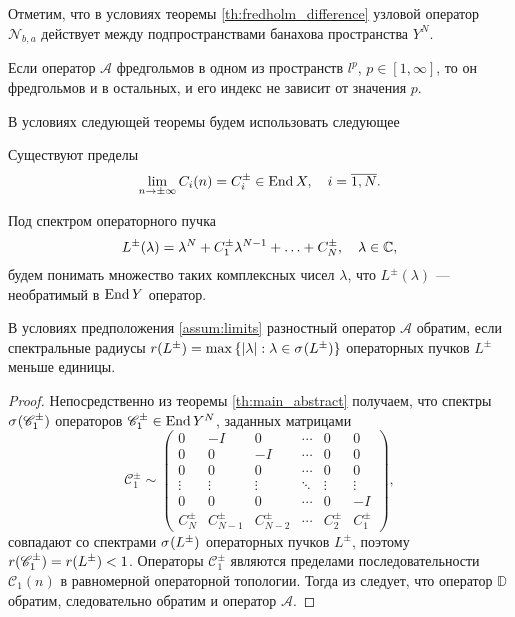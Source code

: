 Отметим, что в условиях теоремы \ref{th:fredholm_difference} узловой оператор $\mathcal N_{b, a}$ действует между подпространствами банахова пространства $Y^N$.

\begin{corollary}
    Если оператор $\mathcal A$ фредгольмов в одном из пространств $l^p$, $p \in [1, \infty]$, то он фредгольмов и в остальных, и его индекс не зависит от значения $p$.
\end{corollary}

В условиях следующей теоремы будем использовать следующее
\begin{assumption}\label{assum:limits}
    Существуют пределы
    \[ \lim_{n\to\pm\infty} C_i(n) = C_i^\pm \in \operatorname{End} X, \quad i = \overline{1,N}. \]
\end{assumption}

Под спектром операторного пучка
\[L^\pm(\lambda) = \lambda^N + C_1^\pm \lambda^{N-1} + \dotsc + C_N^\pm, \quad \lambda \in \mathbb{C}, \]
будем понимать множество таких комплексных чисел $\lambda$, что $L^\pm(\lambda)$ --- необратимый в $\operatorname{End} Y$ оператор.

\begin{theorem}
    В условиях предположения \ref{assum:limits} разностный оператор $\mathcal A$ обратим, если спектральные радиусы $r(L^\pm) = \max\menge{\absv{\lambda} : \lambda \in \spectrum{L^\pm}}$ операторных пучков $L^\pm$ меньше единицы.
\end{theorem}

\begin{proof}
    Непосредственно из теоремы \ref{th:main_abstract} получаем, что спектры $\spectrum{\mathcal C_1^\pm}$ операторов $\mathcal C_1^\pm \in \operatorname{End} Y^N$, заданных матрицами
    \[\mathcal C_1^\pm \sim \begin{pmatrix}
    0 & -I & 0  & \cdots & 0 & 0 \\
    0 & 0  & -I & \cdots & 0 & 0 \\
    0 & 0  & 0 & \cdots & 0 & 0 \\
    \vdots & \vdots & \vdots & \ddots & \vdots & \vdots \\
    0 & 0 & 0 & \cdots & 0 & -I \\
    C_N^\pm & C_{N-1}^\pm & C_{N-2}^\pm & \cdots & C_2^\pm & C_1^\pm
   \end{pmatrix},\]
    совпадают со спектрами $\spectrum{L^\pm}$ операторных пучков $L^\pm$, поэтому $r(\mathcal C_1^\pm) \hm= r(L^\pm) < 1$.
    Операторы $\mathcal C_1^\pm$ являются пределами последовательности $\mathcal C_1(n)$ в равномерной операторной топологии.
    Тогда из \cite[теорема 3]{Bas00} следует, что оператор $\mathbb D$ обратим, следовательно обратим и оператор $\mathcal A$.
\end{proof}


